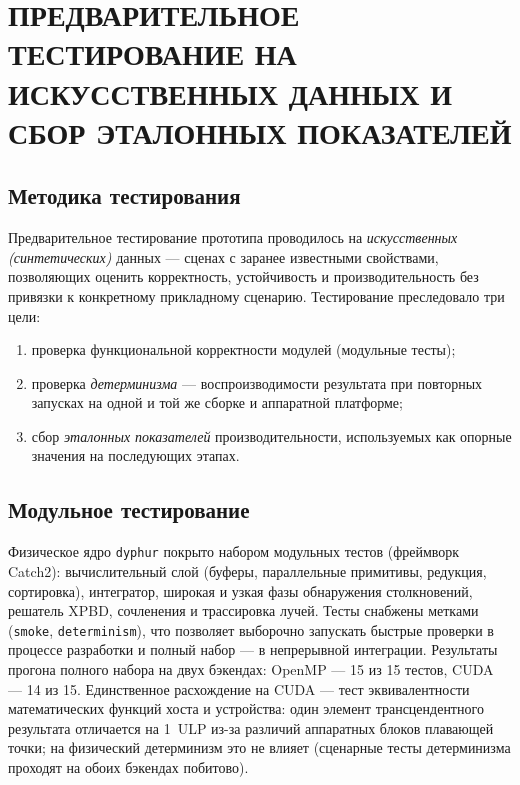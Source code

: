 \chapter{ПРЕДВАРИТЕЛЬНОЕ ТЕСТИРОВАНИЕ НА ИСКУССТВЕННЫХ ДАННЫХ И СБОР ЭТАЛОННЫХ ПОКАЗАТЕЛЕЙ}
\label{cha:test}

\section{Методика тестирования}

Предварительное тестирование прототипа проводилось на \emph{искусственных
(синтетических)} данных --- сценах с заранее известными свойствами, позволяющих
оценить корректность, устойчивость и производительность без привязки к
конкретному прикладному сценарию. Тестирование преследовало три цели:
\begin{enumerate}
  \item проверка функциональной корректности модулей (модульные тесты);
  \item проверка \emph{детерминизма} --- воспроизводимости результата при
        повторных запусках на одной и той же сборке и аппаратной платформе;
  \item сбор \emph{эталонных показателей} производительности, используемых как
        опорные значения на последующих этапах.
\end{enumerate}

\section{Модульное тестирование}

Физическое ядро \texttt{dyphur} покрыто набором модульных тестов (фреймворк
Catch2): вычислительный слой (буферы, параллельные примитивы, редукция,
сортировка), интегратор, широкая и узкая фазы обнаружения столкновений, решатель
XPBD, сочленения и трассировка лучей. Тесты снабжены метками (\texttt{smoke},
\texttt{determinism}), что позволяет выборочно запускать быстрые проверки в
процессе разработки и полный набор --- в непрерывной интеграции. Результаты
прогона полного набора на двух бэкендах: OpenMP --- 15 из 15 тестов, CUDA ---
14 из 15. Единственное расхождение на CUDA --- тест эквивалентности
математических функций хоста и устройства: один элемент трансцендентного
результата отличается на 1~ULP из-за различий аппаратных блоков плавающей
точки; на физический детерминизм это не влияет (сценарные тесты детерминизма
проходят на обоих бэкендах побитово).

